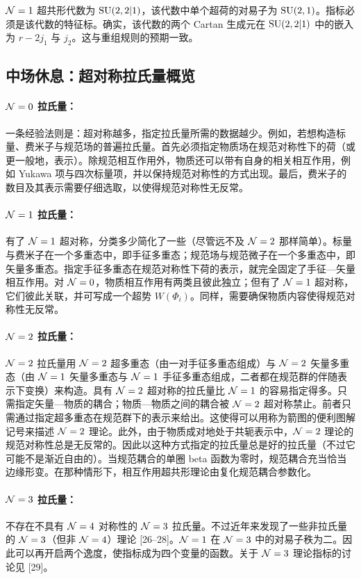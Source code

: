 $\mathcal{N}=1$ 超共形代数为 $\operatorname{SU}(2,2|1)$，该代数中单个超荷的对易子为 $\operatorname{SU}(2,1)$。指标必须是该代数的特征标。确实，该代数的两个 Cartan 生成元在 $\operatorname{SU}(2,2|1)$ 中的嵌入为 $r-2j_1$ 与 $j_2$。这与重组规则的预期一致。

\subsection{中场休息：超对称拉氏量概览}

\paragraph{$\mathcal{N}=0$ 拉氏量：} 一条经验法则是：超对称越多，指定拉氏量所需的数据越少。例如，若想构造标量、费米子与规范场的普遍拉氏量。首先必须指定物质场在规范对称性下的荷（或更一般地，表示）。除规范相互作用外，物质还可以带有自身的相关相互作用，例如 Yukawa 项与四次标量项，并以保持规范对称性的方式出现。最后，费米子的数目及其表示需要仔细选取，以使得规范对称性无反常。

\paragraph{$\mathcal{N}=1$ 拉氏量：} 有了 $\mathcal{N}=1$ 超对称，分类多少简化了一些（尽管远不及 $\mathcal{N}=2$ 那样简单）。标量与费米子在一个多重态中，即手征多重态；规范场与规范微子在一个多重态中，即矢量多重态。指定手征多重态在规范对称性下荷的表示，就完全固定了手征—矢量相互作用。对 $\mathcal{N}=0$，物质相互作用有两类且彼此独立；但有了 $\mathcal{N}=1$ 超对称，它们彼此关联，并可写成一个超势 $W(\Phi_i)$。同样，需要确保物质内容使得规范对称性无反常。

\paragraph{$\mathcal{N}=2$ 拉氏量：} $\mathcal{N}=2$ 拉氏量用 $\mathcal{N}=2$ 超多重态（由一对手征多重态组成）与 $\mathcal{N}=2$ 矢量多重态（由 $\mathcal{N}=1$ 矢量多重态与 $\mathcal{N}=1$ 手征多重态组成，二者都在规范群的伴随表示下变换）来构造。具有 $\mathcal{N}=2$ 超对称的拉氏量比 $\mathcal{N}=1$ 的容易指定得多。只需指定矢量—物质的耦合；物质—物质之间的耦合被 $\mathcal{N}=2$ 超对称禁止。前者只需通过指定超多重态在规范群下的表示来给出。这使得可以用称为箭图的便利图解记号来描述 $\mathcal{N}=2$ 理论。此外，由于物质成对地处于共轭表示中，$\mathcal{N}=2$ 理论的规范对称性总是无反常的。因此以这种方式指定的拉氏量总是好的拉氏量（不过它可能不是渐近自由的）。当规范耦合的单圈 beta 函数为零时，规范耦合充当恰当边缘形变。在那种情形下，相互作用超共形理论由复化规范耦合参数化。

\paragraph{$\mathcal{N}=3$ 拉氏量：} 不存在不具有 $\mathcal{N}=4$ 对称性的 $\mathcal{N}=3$ 拉氏量。不过近年来发现了一些非拉氏量的 $\mathcal{N}=3$（但非 $\mathcal{N}=4$）理论 [26–28]。$\mathcal{N}=1$ 在 $\mathcal{N}=3$ 中的对易子秩为二。因此可以再开启两个逸度，使指标成为四个变量的函数。关于 $\mathcal{N}=3$ 理论指标的讨论见 [29]。


